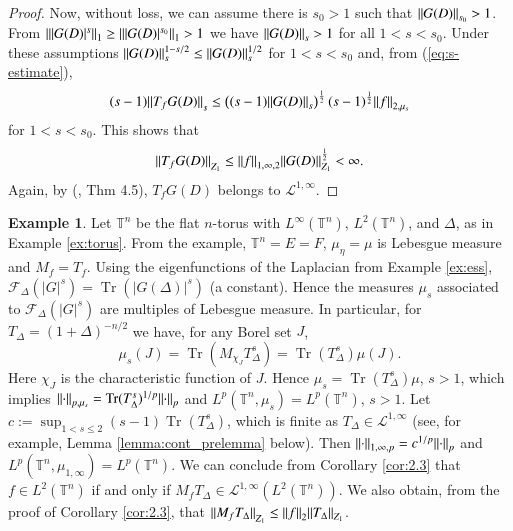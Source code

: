 \documentclass[final,1p]{elsarticle}
\numberwithin{equation}{section}
\theoremstyle{plain}
\theoremstyle{definition}
\newtheorem{ex}[thm]{Example}
\begin{document}
\begin{proof}
Now, without loss, we can assume there is $s_0 > 1$ such that ${\mbox{\ensuremath{\| {G(D)} \|}}}_{s_0} > 1$.  From ${\mbox{\ensuremath{\| {|G(D)|^s} \|}}}_1 \geq {\mbox{\ensuremath{\| {|G(D)|^{s_0}} \|}}}_1 > 1$ we have ${\mbox{\ensuremath{\| {G(D)} \|}}}_s > 1$ for all $1 < s < s_0$. Under these assumptions ${\mbox{\ensuremath{\| {G(D)} \|}}}_s^{1-s/2} \leq {\mbox{\ensuremath{\| {G(D)} \|}}}_s^{1/2}$ for $1 < s < s_0$ and, from (\ref{eq:s-estimate}),
$$
(s-1){\mbox{\ensuremath{\| {T_fG(D)} \|}}}_{s} \leq \left((s-1){\mbox{\ensuremath{\| {G(D)} \|}}}_s \right)^{\frac{1}{2}} (s-1)^{\frac{1}{2}} {\mbox{\ensuremath{\| {f} \|}}}_{2,\mu_{s}}
$$
for $1 < s < s_0$. This shows that
\begin{equation} \label{eq:1inf_est}
{\mbox{\ensuremath{\| {T_fG(D)} \|}}}_{Z_1}
\leq {\mbox{\ensuremath{\| {f} \|}}}_{1,\infty,2} {\mbox{\ensuremath{\| {G(D)} \|}}}_{Z_1}^\frac{1}{2} < \infty .
\end{equation}
Again, by (\cite{CRSS}, Thm 4.5), $T_fG(D)$ belongs to $\mathcal{L}^{1,\infty}$.
\end{proof}

\begin{ex} \label{ex:sec4}
Let ${\ensuremath{\mathbb{T}}}^n$ be the flat $n$-torus with $L^\infty({\ensuremath{\mathbb{T}}}^n)$, $L^2({\ensuremath{\mathbb{T}}}^n)$,
and $\Delta$, as in Example \ref{ex:torus}.  From the example, ${\ensuremath{\mathbb{T}}}^n = E = F$, $\mu_\eta = \mu$ is Lebesgue measure and $M_f = T_f$.
Using the eigenfunctions of the Laplacian from Example \ref{ex:ess},
$\mathcal{F}_\Delta(|G|^s) = \operatorname{Tr}(|G(\Delta)|^s)$ (a constant).
Hence the measures $\mu_s$ associated to $\mathcal{F}_\Delta(|G|^s)$ are
multiples of Lebesgue measure.  In particular, for $T_\Delta = (1+\Delta)^{-n/2}$ we have, for any Borel set $J$,
$$
\mu_s(J) = \operatorname{Tr}(M_{\chi_J} T_\Delta^s ) = \operatorname{Tr}(T_\Delta^s) \mu(J).
$$
Here $\chi_J$ is the characteristic function of $J$.
Hence $\mu_s = \operatorname{Tr}(T_\Delta^s) \mu$, $s > 1$, which implies ${\mbox{\ensuremath{\| {\cdot} \|}}}_{p,\mu_s} = \operatorname{Tr}(T_\Delta^s)^{1/p} {\mbox{\ensuremath{\| {\cdot} \|}}}_p$
and $L^p({\ensuremath{\mathbb{T}}}^n,\mu_s) = L^p({\ensuremath{\mathbb{T}}}^n)$, $s > 1$.
Let $c := \sup_{1 < s \leq 2} (s-1) \operatorname{Tr}(T_\Delta^s)$, which is finite
as $T_\Delta \in \mathcal{L}^{1,\infty}$ (see, for example, Lemma \ref{lemma:cont_prelemma} below).
Then ${\mbox{\ensuremath{\| {\cdot} \|}}}_{1,\infty,p} = c^{1/p} {\mbox{\ensuremath{\| {\cdot} \|}}}_p$
and $L^p({\ensuremath{\mathbb{T}}}^n,\mu_{1,\infty}) = L^p({\ensuremath{\mathbb{T}}}^n)$.
We can conclude from Corollary \ref{cor:2.3} that $f \in L^2({\ensuremath{\mathbb{T}}}^n)$ if and only if
$M_f T_\Delta \in \mathcal{L}^{1,\infty}(L^2({\ensuremath{\mathbb{T}}}^n))$.
We also obtain, from the proof of Corollary \ref{cor:2.3}, that
${\mbox{\ensuremath{\| {M_f T_\Delta} \|}}}_{Z_1} \leq {\mbox{\ensuremath{\| {f} \|}}}_2 {\mbox{\ensuremath{\| {T_\Delta} \|}}}_{Z_1}$.
\end{ex}
\end{document}
